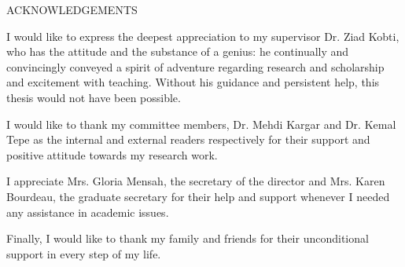 \newpage
{}

\begin{center}
ACKNOWLEDGEMENTS
\end{center}

I would like to express the deepest appreciation to my supervisor Dr. Ziad Kobti, who has the attitude and the substance of a genius: he continually and convincingly conveyed a spirit of adventure regarding research and scholarship and excitement with teaching. Without his guidance and persistent help, this thesis would not have been possible.
\newline
\par I would like to thank my committee members, Dr. Mehdi Kargar and Dr. Kemal Tepe as the internal and external readers respectively for their support and positive attitude towards my research work.
\newline
\par I appreciate Mrs. Gloria Mensah, the secretary of the director and Mrs. Karen Bourdeau, the graduate secretary for their help and support whenever I needed any assistance in academic issues.
\par Finally, I would like to thank my family and friends for their unconditional support in every step of my life.
\newpage
%
